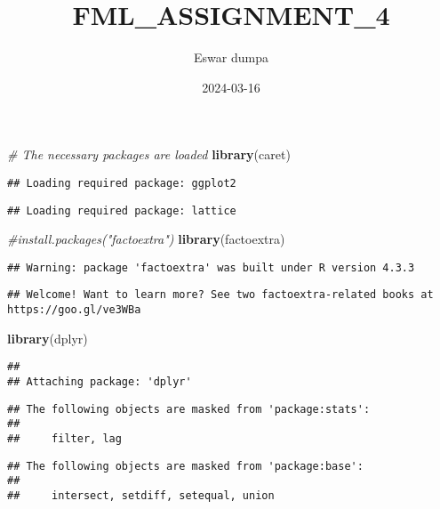 \documentclass[
]{article}
\title{FML\_ASSIGNMENT\_4}
\author{Eswar dumpa}
\date{2024-03-16}
\newenvironment{Shaded}{\begin{snugshade}}{\end{snugshade}}
\newcommand{\CommentTok}[1]{\textcolor[rgb]{0.56,0.35,0.01}{\textit{#1}}}
\newcommand{\FunctionTok}[1]{\textcolor[rgb]{0.13,0.29,0.53}{\textbf{#1}}}
\newcommand{\NormalTok}[1]{#1}
\begin{document}
\maketitle

\begin{Shaded}
\begin{Highlighting}[]
\CommentTok{\# The necessary packages are loaded}
\FunctionTok{library}\NormalTok{(caret)}
\end{Highlighting}
\end{Shaded}

\begin{verbatim}
## Loading required package: ggplot2
\end{verbatim}

\begin{verbatim}
## Loading required package: lattice
\end{verbatim}

\begin{Shaded}
\begin{Highlighting}[]
\CommentTok{\#install.packages("factoextra")}
\FunctionTok{library}\NormalTok{(factoextra)}
\end{Highlighting}
\end{Shaded}

\begin{verbatim}
## Warning: package 'factoextra' was built under R version 4.3.3
\end{verbatim}

\begin{verbatim}
## Welcome! Want to learn more? See two factoextra-related books at https://goo.gl/ve3WBa
\end{verbatim}

\begin{Shaded}
\begin{Highlighting}[]
\FunctionTok{library}\NormalTok{(dplyr)}
\end{Highlighting}
\end{Shaded}

\begin{verbatim}
## 
## Attaching package: 'dplyr'
\end{verbatim}

\begin{verbatim}
## The following objects are masked from 'package:stats':
## 
##     filter, lag
\end{verbatim}

\begin{verbatim}
## The following objects are masked from 'package:base':
## 
##     intersect, setdiff, setequal, union
\end{verbatim}
\end{document}
